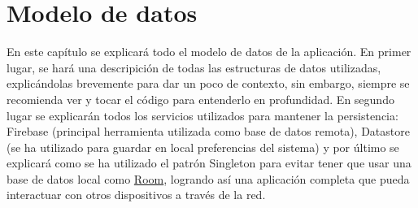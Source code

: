 \chapter{Modelo de datos}
\label{cap:modeloDeDatos}
En este capítulo se explicará todo el modelo de datos de la aplicación. En primer lugar, se hará una descripición de todas las estructuras de datos utilizadas, explicándolas brevemente para dar un poco de contexto, sin embargo, siempre se recomienda ver y tocar el código para entenderlo en profundidad. En segundo lugar se explicarán todos los servicios utilizados para mantener la persistencia: Firebase (principal herramienta utilizada como base de datos remota), Datastore (se ha utilizado para guardar en local preferencias del sistema) y por último se explicará como se ha utilizado el patrón Singleton para evitar tener que usar una base de datos local como \href{https://developer.android.com/training/data-storage/room/}{Room}, logrando así una aplicación completa que pueda interactuar con otros dispositivos a través de la red.
